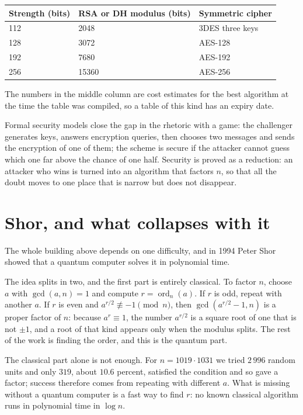\begin{center}
\small
\begin{tabular}{@{}lll@{}}
\toprule
Strength (bits) & RSA or DH modulus (bits) & Symmetric cipher \\
\midrule
112 & 2048 & 3DES three keys \\
128 & 3072 & AES-128 \\
192 & 7680 & AES-192 \\
256 & 15360 & AES-256 \\
\bottomrule
\end{tabular}
\end{center}

The numbers in the middle column are cost estimates for the best algorithm at the time the table was
compiled, so a table of this kind has an expiry date.

Formal security models close the gap in the rhetoric with a game: the challenger generates keys,
answers encryption queries, then chooses two messages and sends the encryption of one of them; the
scheme is secure if the attacker cannot guess which one far above the chance of one half. Security is
proved as a reduction: an attacker who wins is turned into an algorithm that factors $n$, so that all
the doubt moves to one place that is narrow but does not disappear.

\section{Shor, and what collapses with it}

The whole building above depends on one difficulty, and in 1994 Peter Shor showed that a quantum
computer solves it in polynomial time.

The idea splits in two, and the first part is entirely classical. To factor $n$, choose $a$ with
$\gcd(a,n)=1$ and compute $r=\operatorname{ord}_n(a)$. If $r$ is odd, repeat with another $a$. If $r$
is even and $a^{r/2}\not\equiv-1\pmod n$, then $\gcd(a^{r/2}-1,n)$ is a proper factor of $n$: because
$a^r\equiv1$, the number $a^{r/2}$ is a square root of one that is not $\pm1$, and a root of that kind
appears only when the modulus splits. The rest of the work is finding the order, and this is the
quantum part.

The classical part alone is not enough. For $n=1019\cdot1031$ we tried $2\,996$ random units and only
$319$, about $10.6$ percent, satisfied the condition and so gave a factor; success therefore comes
from repeating with different $a$. What is missing without a quantum computer is a fast way to find
$r$: no known classical algorithm runs in polynomial time in $\log n$.

